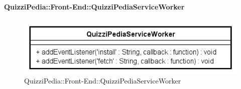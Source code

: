	\paragraph{QuizziPedia::Front-End::QuizziPediaServiceWorker}
		
		\label{QuizziPedia::Front-End::QuizziPediaServiceWorker}
		
		\begin{figure}[ht]
			\centering
			\includegraphics[scale=0.65,keepaspectratio]{UML/Classi/Front-End/QuizziPedia_Front-end_QuizziPediaServiceWorker.png}
			\caption{QuizziPedia::Front-End::QuizziPediaServiceWorker}
		\end{figure} \FloatBarrier
		
